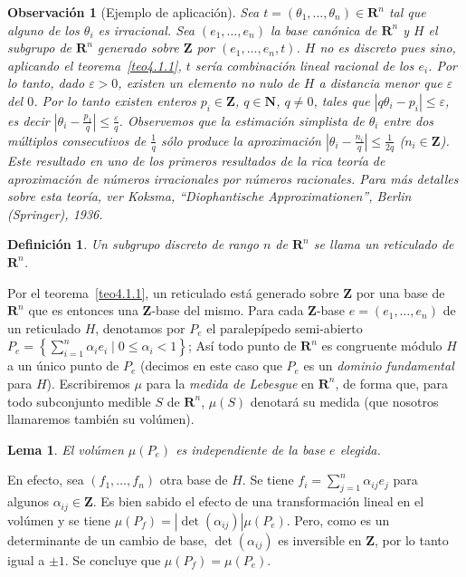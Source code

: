 \documentclass[bibtotoc,leqno,spanish]{amsbook}
\newcommand{\RR}{\mathbf{R}}
\newcommand{\ZZ}{\mathbf{Z}}
\newcommand{\NN}{\mathbf{N}}
\newcommand{\abs}[1]{\left\lvert#1\right\rvert}
\numberwithin{equation}{section}
\theoremstyle{note}
\newtheorem{definition}{Definici\'on}
\theoremstyle{note}
\newtheorem{lemma}{Lema}
\theoremstyle{rem}
\newtheorem*{remark*}{Observaci\'on}
\numberwithin{theorem}{section}
\numberwithin{proposition}{section}
\numberwithin{definition}{section}
\numberwithin{lemma}{section}
\numberwithin{corollary}{section}
\numberwithin{example}{section}
\numberwithin{footnote}{section}%
\begin{document}
\begin{remark*}[Ejemplo de aplicaci\'on]
Sea $t = (\theta_{1},\dots,\theta_{n})\in\RR^{n}$ tal que alguno de
los $\theta_{i}$ es {\em irracional.} Sea $(e_{1},\dots,e_{n})$ la base can\'onica
de $\RR^{n}$ y $H$
el subgrupo de $\RR^{n}$ generado sobre $\ZZ$ por $(e_{1},\dots,e_{n},t)$. $H$ no es
discreto pues sino,
aplicando el teorema~\ref{teo4.1.1}, $t$ ser\'ia combinaci\'on lineal racional de
los $e_{i}$. Por lo tanto, dado
$\varepsilon > 0$, existen un elemento no nulo de $H$ a distancia menor que $\varepsilon$
del $0$. Por
lo tanto existen enteros $p_{i}\in\ZZ$, $q\in\NN$, $q\neq 0$, tales que
$\abs{q\theta_{i}-p_{i}}\leq\varepsilon$,
es decir $\abs{\theta_{i}-\frac{p_{1}}{q}}\leq\frac{\varepsilon}{q}$. Observemos que
la estimaci\'on simplista de $\theta_{i}$ entre dos m\'ultiplos consecutivos de
$\frac{1}{q}$ s\'olo
produce la aproximaci\'on $\abs{\theta_{i}-\frac{n_{i}}{q}}\leq\frac{1}{2q}$ ($n_{i}\in\ZZ$).
Este resultado en uno de los primeros resultados de la rica teor\'ia de aproximaci\'on de
n\'umeros
irracionales por n\'umeros racionales. Para m\'as detalles sobre esta teor\'ia, ver
Koksma, ``Diophantische Approximationen'', Berlin (Springer), 1936.
\end{remark*}

\begin{definition}
Un subgrupo discreto de rango $n$ de $\RR^{n}$ se llama un reticulado de $\RR^{n}$.
\end{definition}

Por el teorema~\ref{teo4.1.1}, un reticulado est\'a generado sobre $\ZZ$ por una base
de $\RR^{n}$ que es entonces
una $\ZZ$-base del mismo. Para cada $\ZZ$-base $e = (e_{1},\dots,e_{n})$ de un
reticulado $H$, denotamos
por $P_{e}$ el paralep\'ipedo semi-abierto
$P_{e} = \left\{\sum_{i=1}^{n}\alpha_{i}e_{i}\mid 0\leq \alpha_{i}<1\right\}$;
As\'i todo punto de $\RR^{n}$ es congruente m\'odulo $H$ a un \'unico punto de $P_{e}$
(decimos en este
caso que $P_{e}$ es un {\em dominio fundamental} para $H$). Escribiremos $\mu$ para
la {\em medida de
Lebesgue} en $\RR^{n}$, de forma que, para todo subconjunto medible $S$ de $\RR^{n}$,
$\mu(S)$ denotar\'a
su medida (que nosotros llamaremos tambi\'en su vol\'umen).

\begin{lemma}
El vol\'umen $\mu(P_{e})$ es independiente de la base $e$ elegida.
\end{lemma}

En efecto, sea $(f_{1},\dots,f_{n})$ otra base de $H$. Se tiene
$f_{i} = \sum_{j=1}^{n}\alpha_{ij}e_{j}$
para algunos $\alpha_{ij}\in\ZZ$. Es bien sabido el efecto de una transformaci\'on lineal
en el vol\'umen y
se tiene $\mu(P_{f}) = \abs{\det(\alpha_{ij})}\mu(P_{e})$. Pero, como es un determinante de
un cambio de base,
$\det(\alpha_{ij})$ es inversible en $\ZZ$, por lo tanto igual a $\pm 1$. Se concluye
que $\mu(P_{f}) = \mu(P_{e})$.
\end{document}
